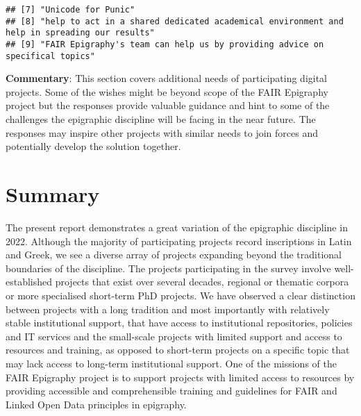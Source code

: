 \documentclass[
]{article}
\begin{document}
\begin{verbatim}
## [7] "Unicode for Punic"                                                                                                                                                                                                                                                                                                                                                                                                                                  
## [8] "help to act in a shared dedicated academical environment and help in spreading our results"                                                                                                                                                                                                                                                                                                                                                         
## [9] "FAIR Epigraphy's team can help us by providing advice on specifical topics"
\end{verbatim}

\textbf{Commentary}: This section covers additional needs of
participating digital projects. Some of the wishes might be beyond scope
of the FAIR Epigraphy project but the responses provide valuable
guidance and hint to some of the challenges the epigraphic discipline
will be facing in the near future. The responses may inspire other
projects with similar needs to join forces and potentially develop the
solution together.

\hypertarget{summary}{%
\section{Summary}\label{summary}}

The present report demonstrates a great variation of the epigraphic
discipline in 2022. Although the majority of participating projects
record inscriptions in Latin and Greek, we see a diverse array of
projects expanding beyond the traditional boundaries of the discipline.
The projects participating in the survey involve well-established
projects that exist over several decades, regional or thematic corpora
or more specialised short-term PhD projects. We have observed a clear
distinction between projects with a long tradition and most importantly
with relatively stable institutional support, that have access to
institutional repositories, policies and IT services and the small-scale
projects with limited support and access to resources and training, as
opposed to short-term projects on a specific topic that may lack access
to long-term institutional support. One of the missions of the FAIR
Epigraphy project is to support projects with limited access to
resources by providing accessible and comprehensible training and
guidelines for FAIR and Linked Open Data principles in epigraphy.
\end{document}
